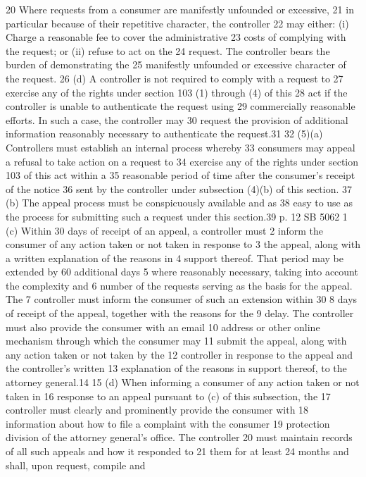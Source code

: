 20 Where requests from a consumer are manifestly unfounded or excessive,
21 in particular because of their repetitive character, the controller
22 may either: (i) Charge a reasonable fee to cover the administrative
23 costs of complying with the request; or (ii) refuse to act on the
24 request. The controller bears the burden of demonstrating the
25 manifestly unfounded or excessive character of the request.
26 (d) A controller is not required to comply with a request to
27 exercise any of the rights under section 103 (1) through (4) of this
28 act if the controller is unable to authenticate the request using
29 commercially reasonable efforts. In such a case, the controller may
30 request the provision of additional information reasonably necessary
to authenticate the request.31
32 (5)(a) Controllers must establish an internal process whereby
33 consumers may appeal a refusal to take action on a request to
34 exercise any of the rights under section 103 of this act within a
35 reasonable period of time after the consumer's receipt of the notice
36 sent by the controller under subsection (4)(b) of this section.
37 (b) The appeal process must be conspicuously available and as
38 easy to use as the process for submitting such a request under this
section.39
p. 12 SB 5062
1 (c) Within 30 days of receipt of an appeal, a controller must
2 inform the consumer of any action taken or not taken in response to
3 the appeal, along with a written explanation of the reasons in
4 support thereof. That period may be extended by 60 additional days
5 where reasonably necessary, taking into account the complexity and
6 number of the requests serving as the basis for the appeal. The
7 controller must inform the consumer of such an extension within 30
8 days of receipt of the appeal, together with the reasons for the
9 delay. The controller must also provide the consumer with an email
10 address or other online mechanism through which the consumer may
11 submit the appeal, along with any action taken or not taken by the
12 controller in response to the appeal and the controller's written
13 explanation of the reasons in support thereof, to the attorney
general.14
15 (d) When informing a consumer of any action taken or not taken in
16 response to an appeal pursuant to (c) of this subsection, the
17 controller must clearly and prominently provide the consumer with
18 information about how to file a complaint with the consumer
19 protection division of the attorney general's office. The controller
20 must maintain records of all such appeals and how it responded to
21 them for at least 24 months and shall, upon request, compile and
